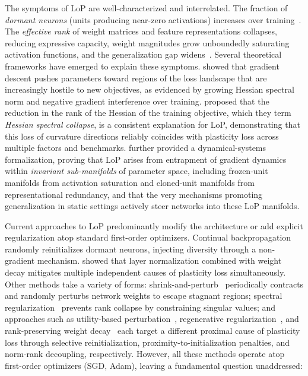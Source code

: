 \documentclass{article}
\begin{document}
The symptoms of LoP are well-characterized and interrelated. The fraction of \emph{dormant 
neurons} (units producing near-zero activations) increases over training~\citep{sokar2023dormant}. 
The \emph{effective rank} of weight matrices and feature representations collapses, 
reducing expressive capacity, weight magnitudes grow unboundedly saturating activation 
functions, and the generalization gap widens~\citep{dohare2024loss}. Several theoretical frameworks have 
emerged to explain these symptoms. \citet{lyle2023understanding} showed that gradient descent pushes parameters toward regions 
of the loss landscape that are increasingly hostile to new objectives, as evidenced by 
growing Hessian spectral norm and negative gradient interference over training. \citet{lewandowski2024curvature} proposed that the reduction in the rank of the Hessian 
of the training objective, which they term \emph{Hessian spectral collapse}, is a 
consistent explanation for LoP, demonstrating that this loss of curvature directions 
reliably coincides with plasticity loss across multiple factors and benchmarks. 
\citet{joudaki2026barriers} further provided a dynamical-systems formalization, proving that 
LoP arises from entrapment of gradient dynamics within \emph{invariant sub-manifolds} of 
parameter space, including frozen-unit manifolds from activation saturation and cloned-unit 
manifolds from representational redundancy, and that the very mechanisms promoting 
generalization in static settings actively steer networks into these LoP manifolds.

Current approaches to LoP predominantly modify the architecture or add explicit 
regularization atop standard first-order optimizers. Continual 
backpropagation~\citep{dohare2024loss} randomly reinitializes dormant neurons, injecting 
diversity through a non-gradient mechanism. \citet{lyle2025disentangling} showed that layer 
normalization combined with weight decay mitigates multiple independent causes of plasticity 
loss simultaneously. Other methods take a variety of forms: shrink-and-perturb~\citep{ash2020warm, 
juliani2024plasticity} periodically contracts and randomly perturbs network weights to 
escape stagnant regions; spectral regularization~\citep{lewandowski2025spectral} prevents 
rank collapse by constraining singular values; and approaches such as utility-based 
perturbation~\citep{elsayed2024upgd}, regenerative regularization~\citep{kumar2025l2init}, 
and rank-preserving weight decay~\citep{wu2026rank} each target a different proximal cause 
of plasticity loss through selective reinitialization, proximity-to-initialization 
penalties, and norm-rank decoupling, respectively. However, all these methods operate atop first-order optimizers 
(SGD, Adam), leaving a fundamental question unaddressed:
\end{document}
